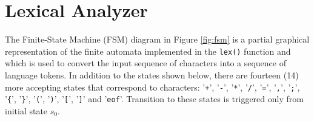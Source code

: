 \documentclass{article}
\def\code#1{\texttt{#1}} %
\begin{document}

\section{Lexical Analyzer}

The Finite-State Machine (FSM) diagram in Figure \ref{fig:fsm} is a partial graphical representation of the
finite automata implemented in the \code{lex()} function and which is used to convert the input
sequence of characters into a sequence of language tokens. In addition to the states shown below,
there are fourteen (14) more accepting states that correspond to characters: '\code{+}', '\code{-}', '\code{*}', 
'\code{/}', '\code{=}', '\code{,}', '\code{;}', '\code{\{}', '\code{\}}', '\code{(}', '\code{)}', 
'\code{[}', '\code{]}' and '\code{eof}'. Transition to these states is triggered only from initial state $s_0$.
\vspace{1cm}
\end{document}
